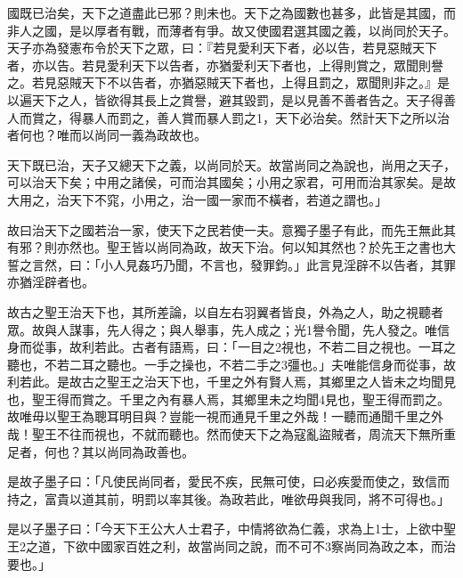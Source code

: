 \begin{pinyinscope}
國既已治矣，天下之道盡此已邪？則未也。天下之為國數也甚多，此皆是其國，而非人之國，是以厚者有戰，而薄者有爭。故又使國君選其國之義，以尚同於天子。天子亦為發憲布令於天下之眾，曰：『若見愛利天下者，必以告，若見惡賊天下者，亦以告。若見愛利天下以告者，亦猶愛利天下者也，上得則賞之，眾聞則譽之。若見惡賊天下不以告者，亦猶惡賊天下者也，上得且罰之，眾聞則非之。』是以遍天下之人，皆欲得其長上之賞譽，避其毀罰，是以見善不善者告之。天子得善人而賞之，得暴人而罰之，善人賞而暴人罰之1，天下必治矣。然計天下之所以治者何也？唯而以尚同一義為政故也。

天下既已治，天子又總天下之義，以尚同於天。故當尚同之為說也，尚用之天子，可以治天下矣；中用之諸侯，可而治其國矣；小用之家君，可用而治其家矣。是故大用之，治天下不窕，小用之，治一國一家而不橫者，若道之謂也。」

故曰治天下之國若治一家，使天下之民若使一夫。意獨子墨子有此，而先王無此其有邪？則亦然也。聖王皆以尚同為政，故天下治。何以知其然也？於先王之書也大誓之言然，曰：「小人見姦巧乃聞，不言也，發罪鈞。」此言見淫辟不以告者，其罪亦猶淫辟者也。

故古之聖王治天下也，其所差論，以自左右羽翼者皆良，外為之人，助之視聽者眾。故與人謀事，先人得之；與人舉事，先人成之；光1譽令聞，先人發之。唯信身而從事，故利若此。古者有語焉，曰：「一目之2視也，不若二目之視也。一耳之聽也，不若二耳之聽也。一手之操也，不若二手之3彊也。」夫唯能信身而從事，故利若此。是故古之聖王之治天下也，千里之外有賢人焉，其鄉里之人皆未之均聞見也，聖王得而賞之。千里之內有暴人焉，其鄉里未之均聞4見也，聖王得而罰之。故唯毋以聖王為聰耳明目與？豈能一視而通見千里之外哉！一聽而通聞千里之外哉！聖王不往而視也，不就而聽也。然而使天下之為寇亂盜賊者，周流天下無所重足者，何也？其以尚同為政善也。

是故子墨子曰：「凡使民尚同者，愛民不疾，民無可使，曰必疾愛而使之，致信而持之，富貴以道其前，明罰以率其後。為政若此，唯欲毋與我同，將不可得也。」

是以子墨子曰：「今天下王公大人士君子，中情將欲為仁義，求為上1士，上欲中聖王2之道，下欲中國家百姓之利，故當尚同之說，而不可不3察尚同為政之本，而治要也。」


\end{pinyinscope}